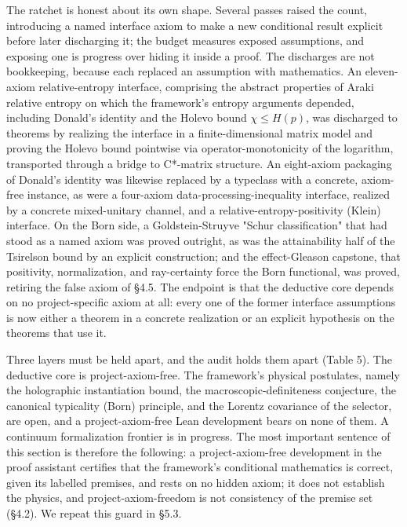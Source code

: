 \documentclass[11pt]{article}
\begin{document}
The ratchet is honest about its own shape. Several passes raised the count, introducing a named
interface axiom to make a new conditional result explicit before later discharging it; the budget
measures exposed assumptions, and exposing one is progress over hiding it inside a proof. The
discharges are not bookkeeping, because each replaced an assumption with mathematics. An eleven-axiom
relative-entropy interface, comprising the abstract properties of Araki relative entropy on which
the framework's entropy arguments depended, including Donald's identity and the Holevo bound
$\chi \le H(p)$, was discharged to theorems by realizing the interface in a finite-dimensional
matrix model and proving the Holevo bound pointwise via operator-monotonicity of the logarithm,
transported through a bridge to C*-matrix structure. An eight-axiom packaging of Donald's identity
was likewise replaced by a typeclass with a concrete, axiom-free instance, as were a four-axiom
data-processing-inequality interface, realized by a concrete mixed-unitary channel, and a
relative-entropy-positivity (Klein) interface. On the Born side, a Goldstein-Struyve "Schur
classification" that had stood as a named axiom was proved outright, as was the attainability half
of the Tsirelson bound by an explicit construction; and the effect-Gleason capstone, that
positivity, normalization, and ray-certainty force the Born functional, was proved, retiring the
false axiom of §4.5. The endpoint is that the deductive core depends on no project-specific axiom
at all: every one of the former interface assumptions is now either a theorem in a concrete
realization or an explicit hypothesis on the theorems that use it.

Three layers must be held apart, and the audit holds them apart (Table 5). The deductive core is
project-axiom-free. The framework's physical postulates, namely the holographic instantiation bound,
the macroscopic-definiteness conjecture, the canonical typicality (Born) principle, and the Lorentz
covariance of the selector, are open, and a project-axiom-free Lean development bears on none of them.
A continuum formalization frontier is in progress. The most important sentence of this section is
therefore the following: a project-axiom-free development in the proof assistant certifies that the
framework's conditional mathematics is correct, given its labelled premises, and rests on no hidden
axiom; it does not establish the physics, and project-axiom-freedom is not consistency of the premise
set (§4.2). We repeat this guard in §5.3.
\end{document}
